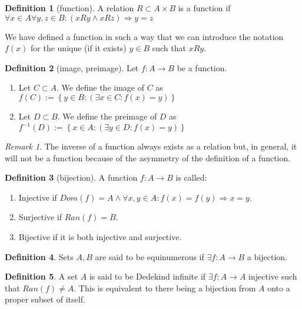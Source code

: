\documentclass{article}
\theoremstyle{definition}
\newtheorem{definition}{Definition}[subsection]
\theoremstyle{remark}
\newtheorem*{remark}{Remark}
\theoremstyle{plain}
\begin{document}
\begin{definition}[function]
    A relation \(R\subset A\times B\) is a function if \(\forall x \in A \forall y,z\in B: (xRy \land xRz) \Rightarrow y=z\)
\end{definition}

We have defined a function in such a way that we can introduce the notation \(f(x)\) for the unique (if it exists) \(y\in B\) such that \(xRy\).

\begin{definition}[image, preimage]
    Let \(f: A\to B\) be a function.
    \begin{enumerate}
        \item Let  \(C\subset A\). We define the image of \(C\) as \(f(C):=\left\{ y\in B : (\exists x \in C: f(x) = y) \right\}\)
        \item Let \(D\subset B\). We define the preimage of \(D\) as \(f^{-1}(D):=\left\{ x\in A: (\exists y\in D: f(x) = y) \right\}\)
    \end{enumerate}
\end{definition}

\begin{remark}
    The inverse of a function always exists as a relation but, in general, it will not be a function because of the asymmetry of the definition of a function.
\end{remark}

\begin{definition}[bijection]
    A function \(f:A\to B\) is called:
    \begin{enumerate}
        \item Injective if \(Dom(f) = A \land \forall x,y \in A: f(x) = f(y) \Rightarrow x = y\). 
        \item Surjective if \(Ran(f) = B\).
        \item Bijective if it is both injective and surjective. 
    \end{enumerate}
\end{definition}

\begin{definition}
    Sets \(A,B\) are said to be equinumerous if \(\exists f:A\to B\) a bijection. 
\end{definition}

\begin{definition}
    A set \(A\) is said to be Dedekind infinite if \(\exists f:A\to A\) injective such that \(Ran(f) \neq A\). This is equivalent to there being a bijection from \(A\) onto a proper subset of itself. 
\end{definition}
\end{document}
